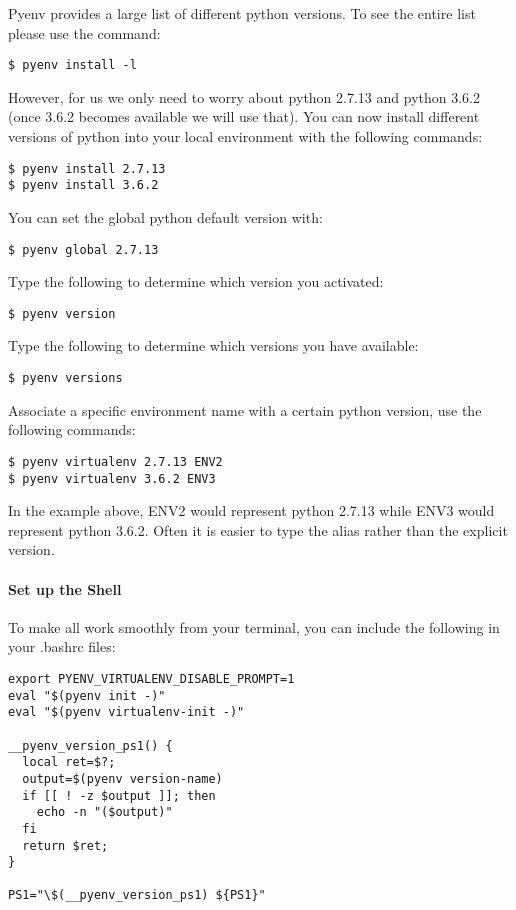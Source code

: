Pyenv provides a large list of different python versions. To see the
entire list please use the command:

\begin{verbatim}
$ pyenv install -l
\end{verbatim}

However, for us we only need to worry about python 2.7.13 and python
3.6.2 (once 3.6.2 becomes available we will use that). You can now
install different versions of python into your local environment with
the following commands:

\begin{verbatim}
$ pyenv install 2.7.13
$ pyenv install 3.6.2
\end{verbatim}

You can set the global python default version with:

\begin{verbatim}
$ pyenv global 2.7.13
\end{verbatim}

Type the following to determine which version you activated:

\begin{verbatim}
$ pyenv version
\end{verbatim}

Type the following to determine which versions you have available:

\begin{verbatim}
$ pyenv versions
\end{verbatim}

Associate a specific environment name with a certain python version, use
the following commands:

\begin{verbatim}
$ pyenv virtualenv 2.7.13 ENV2
$ pyenv virtualenv 3.6.2 ENV3
\end{verbatim}

In the example above, ENV2 would represent python 2.7.13 while ENV3
would represent python 3.6.2. Often it is easier to type the alias
rather than the explicit version.

\paragraph{Set up the Shell}\label{set-up-the-shell}

To make all work smoothly from your terminal, you can include the
following in your .bashrc files:

\begin{verbatim}
export PYENV_VIRTUALENV_DISABLE_PROMPT=1
eval "$(pyenv init -)"
eval "$(pyenv virtualenv-init -)"

__pyenv_version_ps1() {
  local ret=$?;
  output=$(pyenv version-name)
  if [[ ! -z $output ]]; then
    echo -n "($output)"
  fi
  return $ret;
}

PS1="\$(__pyenv_version_ps1) ${PS1}"
\end{verbatim}

